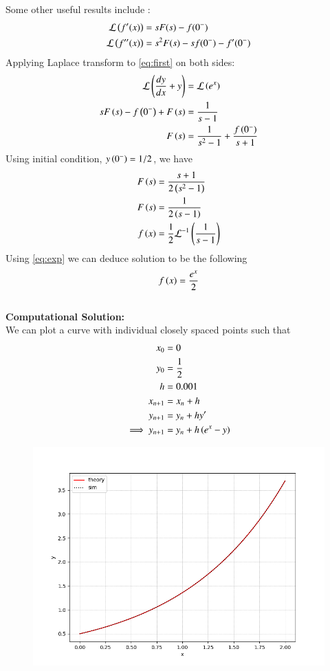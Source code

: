 \documentclass[journal,12pt,onecolumn]{IEEEtran}
\theoremstyle{remark}
\begin{document}
Some other useful results include :
		\begin{align}
			\mathcal{L} \left(f^{\prime}(x)\right) &= s F(s) - f(0^{-}) \\
			\mathcal{L} \left(f^{\prime \prime}(x)\right) &= s^2 F(s) - s f(0^{-}) - f^{\prime}(0^{-}) 
		\end{align}
Applying Laplace transform to \eqref{eq:first} on both sides:\\
\begin{align}
    \mathcal{L}\left(\frac{dy}{dx}+y\right)&=\mathcal{L}\left(e^x\right)\\
    sF\left(s\right)-f\left(0^-\right)+F\left(s\right)&=\frac{1}{s-1}\\
    F\left(s\right)&=\frac{1}{s^2-1}+\frac{f\left(0^-\right)}{s+1}
\end{align}
Using initial condition, $y\left(0^-\right)=1/2$, we have
\begin{align}
    F\left(s\right)&=\frac{s+1}{2\left(s^2-1\right)}\\
    F\left(s\right)&=\frac{1}{2\left(s-1\right)}\\
    f\left(x\right)&=\frac{1}{2}\mathcal{L}^{-1}\left(\frac{1}{s-1}\right)
\end{align}
Using \eqref{eq:exp} we can deduce solution to be the following
\begin{align}
    f\left(x\right)=\frac{e^x}{2}
\end{align}
\\
\textbf{Computational Solution:}\\
We can plot a curve with individual closely spaced points such that
\begin{align}
    x_0&=0\\
    y_0&=\frac{1}{2}\\
    h&=0.001\\
    x_{n+1}&=x_{n}+h\\
    y_{n+1}&=y_n+hy^\prime\\
    \implies y_{n+1}&=y_n+h\left(e^x-y\right)
\end{align}
\begin{figure}[h]
    \centering
    \includegraphics[width=\columnwidth]{figs/fig.png}
 \end{figure}
\end{document}
